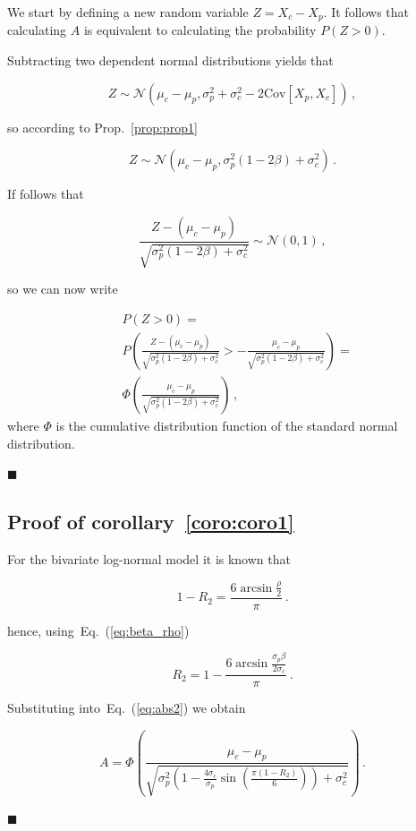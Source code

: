 \documentclass[12pt]{article}
\newcommand*{\qed}{\hfill\ensuremath{\blacksquare}}%
\newcommand{\eref}[1]{Eq.~(\ref{eq:#1})}
\newcommand{\pref}[1]{Prop.~\ref{prop:#1}}
\newcommand{\creflong}[1]{corollary~\ref{coro:#1}}
\newcommand{\be}{\begin{equation}}
\newcommand{\ee}{\end{equation}}
\numberwithin{equation}{section}
\begin{document}
We start by defining a new random variable $Z = X_c-X_p$. It follows that calculating $A$ is equivalent to calculating the probability $P\left(Z>0\right)$.

Subtracting two dependent normal distributions yields that

\be
Z \sim \mathcal{N}\left(\mu_c - \mu_p,\sigma_p^2 + \sigma_c^2 - 2\text{Cov}\left[X_p,X_c\right]\right)\,,
\ee

so according to \pref{prop1}

\be
Z \sim \mathcal{N}\left(\mu_c - \mu_p,\sigma_p^2\left(1-2\beta\right) + \sigma_c^2\right)\,.
\ee

If follows that

\be
\frac{Z - \left(\mu_c - \mu_p\right)}{\sqrt{\sigma_p^2\left(1-2\beta\right) + \sigma_c^2}} \sim \mathcal{N}\left(0,1\right)\,,
\ee

so we can now write

\be
\begin{split}
&P\left(Z>0\right) = \\ & P\left(\frac{Z - (\mu_c - \mu_p)}{\sqrt{\sigma_p^2\left(1-2\beta\right) + \sigma_c^2}} > -\frac{\mu_c - \mu_p}{\sqrt{\sigma_p^2\left(1-2\beta\right) + \sigma_c^2}} \right) = \\ &\Phi\left(\frac{\mu_c - \mu_p}{\sqrt{\sigma_p^2\left(1 - 2\beta\right) + \sigma_c^2}}\right) \,,
\end{split}
\ee
where $\Phi$ is the cumulative distribution function of the standard normal distribution.

\qed

\subsection{Proof of \creflong{coro1}}

For the bivariate log-normal model it is known that~\citep{trivedi2007copula}

\be
1-R_2 = \frac{6\arcsin{\frac{\rho}{2}}}{\pi}\,.
\ee

hence, using~\eref{beta_rho}

\be
R_2 = 1- \frac{6\arcsin{\frac{\sigma_p\beta}{2\sigma_c}}}{\pi}\,.
\ee

Substituting into~\eref{abs2} we obtain

\be
A = \Phi\left(\frac{\mu_c - \mu_p}{\sqrt{\sigma_p^2\left(1 - \frac{4\sigma_c}{\sigma_p}\sin{\left(\frac{\pi\left(1-R_2\right)}{6}\right)}\right) + \sigma_c^2}}\right) \,.
\ee

\qed
\end{document}
